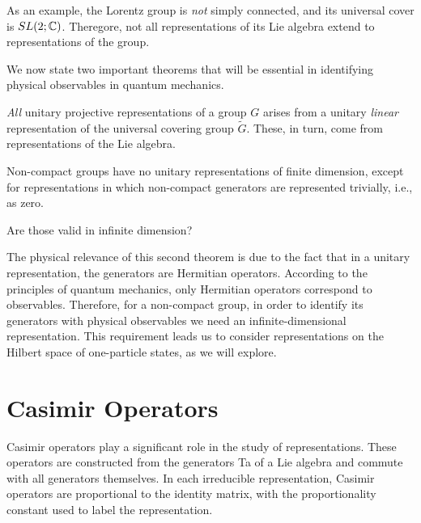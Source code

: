 As an example, the Lorentz group is \emph{not} simply connected, and its universal cover is $SL(2;\mathbb{C})$. Theregore, not all representations of its Lie algebra extend to representations of the group.

We now state two important theorems that will be essential in identifying physical observables in quantum mechanics.
\begin{theorem}\label{th:unitary-rep}
    \emph{All} unitary projective representations of a group $G$ arises from a unitary \emph{linear} representation of the universal covering group $\tilde{G}$. These, in turn, come from representations of the Lie algebra.
\end{theorem}


\begin{theorem}\label{th:non-compact-group-rep}
    Non-compact groups have no unitary representations of finite dimension, except for representations in which non-compact generators are represented trivially, i.e., as zero.
\end{theorem}

\color{red} Are those valid in infinite dimension?\color{black}

The physical relevance of this second theorem is due to the fact that in a unitary representation, the generators are Hermitian operators. According to the principles of quantum mechanics, only Hermitian operators correspond to observables. Therefore, for a non-compact group, in order to identify its generators with physical observables we need an infinite-dimensional representation. This requirement leads us to consider representations on the Hilbert space of one-particle states, as we will explore.



\section{Casimir Operators}\label{sec:casimir}
Casimir operators play a significant role in the study of representations. These operators are constructed from the generators Ta of a Lie algebra and commute with all generators themselves. In each irreducible representation, Casimir operators are proportional to the identity matrix, with the proportionality constant used to label the representation.